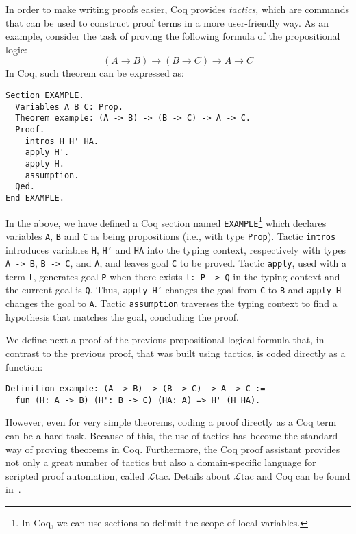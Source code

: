 \documentclass[3p,times]{elsarticle}
\begin{document}
In order to make writing proofs easier, Coq provides
\emph{tactics}, which are commands that can be used to construct proof
terms in a more user-friendly way. As an example, consider the task of proving the following
formula of the propositional logic:
\[
(A \to B)\to (B\to C) \to A \to C
\]
In Coq, such theorem can be expressed as:
\begin{verbatim}
Section EXAMPLE.
  Variables A B C: Prop.
  Theorem example: (A -> B) -> (B -> C) -> A -> C.
  Proof.
    intros H H' HA.
    apply H'.
    apply H.
    assumption.
  Qed.
End EXAMPLE.
\end{verbatim}
In the above, we have defined a Coq section named
\texttt{EXAMPLE}\footnote{In Coq, we can use sections to delimit the
  scope of local variables.} which declares variables \texttt{A},
\texttt{B} and \texttt{C} as being propositions (i.e., with type
\texttt{Prop}). Tactic \texttt{intros} introduces variables
\texttt{H}, \texttt{H'} and \texttt{HA} into the typing context,
respectively with types \texttt{A -> B}, \texttt{B -> C}, and
\texttt{A}, and leaves goal \texttt{C} to be proved. Tactic
\texttt{apply}, used with a term \texttt{t}, generates goal
\texttt{P}
when there exists \texttt{t: P -> Q} in the typing context and the
current goal is \texttt{Q}. Thus, \texttt{apply H'} changes the goal
from \texttt{C} to \texttt{B} and \texttt{apply H}
changes the goal to \texttt{A}. Tactic \texttt{assumption}
traverses the typing context to find a hypothesis that matches the goal,
concluding the proof.

We define next a proof of the previous propositional logical formula
that, in contrast to the previous proof, that was built using tactics, is coded
directly as a function:
\begin{verbatim}
Definition example: (A -> B) -> (B -> C) -> A -> C :=
  fun (H: A -> B) (H': B -> C) (HA: A) => H' (H HA).
\end{verbatim}
However, even for very simple theorems, coding a proof directly
as a Coq term can be a hard task. Because of this, the use of tactics
has become the standard way of proving theorems in Coq. Furthermore,
the Coq proof assistant provides not only a great number of tactics
but also a domain-specific language for scripted proof automation,
called $\mathcal{L}$tac. Details about $\mathcal{L}$tac and Coq can be found
in~\cite{Chlipala13,Bertot10,manual_coq}.
\end{document}
